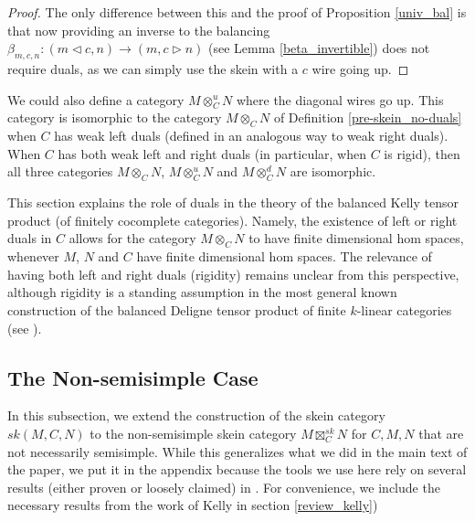 \begin{proof}
  The only difference between this and the proof of Proposition \ref{univ_bal}
  is that now providing an inverse to the balancing $\beta_{m,c,n}:(m\lhd c,
  n)\to (m,c\rhd n)$ (see Lemma \ref{beta_invertible}) does not require duals,
  as we can simply use the skein with a $c$ wire going up.
\end{proof}
  
\begin{remark}
  We could also define a category $M\otimes_C^u N$ where the diagonal wires go
  up. This category is isomorphic to the category $M\otimes_C N$ of Definition
  \ref{pre-skein_no-duals} when $C$ has weak left duals (defined in an
  analogous way to weak right duals). When $C$ has both weak left and right
  duals (in particular, when $C$ is rigid), then all three categories
  $M\otimes_C N$, $M\otimes^u_C N$ and $M\otimes_C^d N$ are isomorphic.
\end{remark}

\begin{remark}

  \noindent This section explains the role of duals in the theory of the
  balanced Kelly tensor product (of finitely cocomplete categories). Namely,
  the existence of left or right duals in $C$ allows for the category
  $M \otimes_C N$ to have finite dimensional hom spaces, whenever $M$, $N$ and
  $C$ have finite dimensional hom spaces. The relevance of having both left
  and right duals (rigidity) remains unclear from this perspective, although
  rigidity is a standing assumption in the most general known construction of
  the balanced Deligne tensor product of finite $k$-linear categories (see
  \cite{douglas/balanced-product}).
\end{remark}

\subsection{The Non-semisimple Case} \label{section-nonsemisimple}

In this subsection, we extend the construction of the skein category
$sk(M,C,N)$ to the non-semisimple skein category $M \boxtimes_C^{sk} N$ for
$C, M, N$ that are not necessarily semisimple. While this generalizes what we
did in the main text of the paper, we put it in the appendix because the tools
we use here rely on several results (either proven or loosely claimed) in
\cite{kelly/basic-concepts-enriched}. For convenience, we include the
necessary results from the work of Kelly in section \ref{review_kelly})

